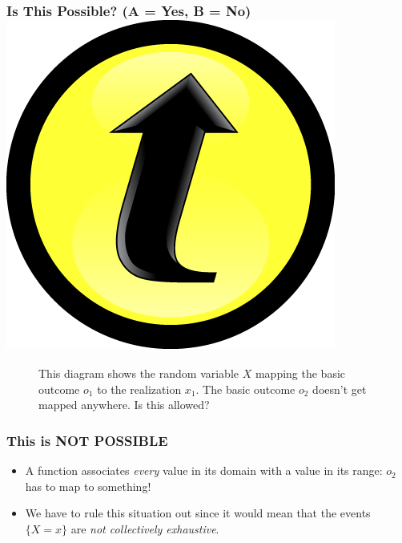 \begin{frame}
\frametitle{Is This Possible? (A = Yes, B = No) \hfill \includegraphics[scale = 0.05]{./images/clicker}}

\begin{figure}
\centering
{}
\caption{This diagram shows the random variable $X$ mapping the basic outcome $o_1$ to the realization $x_1$. The basic outcome $o_2$ doesn't get mapped anywhere. Is this allowed?}
\end{figure}

\end{frame}
\begin{frame}
\frametitle{This is NOT POSSIBLE}



\begin{figure}
\end{figure}
\begin{itemize}
	\item A function associates \emph{every} value in its domain with a value in its range: $o_2$ has to map to something!
	\item We have to rule this situation out since it would mean that the events $\{X = x\}$ are \emph{not collectively exhaustive}. 
\end{itemize}


\end{frame}

